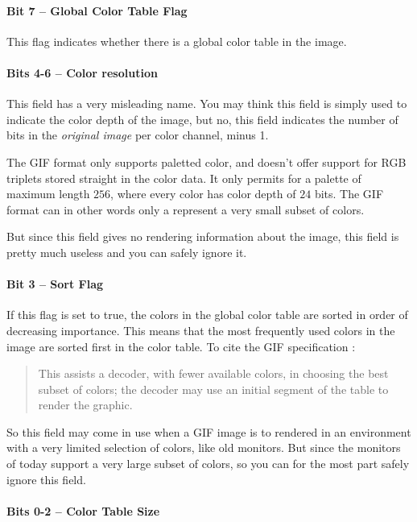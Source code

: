 \paragraph{Bit 7 --  Global Color Table Flag}

This flag indicates whether there is a global color table in the
image.

\paragraph{Bits 4-6 -- Color resolution}

This field has a very misleading name. You may think this field is
simply used to indicate the color depth of the image, but no, this
field indicates the number of bits in the \textit{original image} per
color channel, minus 1.

The GIF format only supports paletted color, and doesn't offer support
for RGB triplets stored straight in the color data. It only permits
for a palette of maximum length $256$, where every color has color
depth of $24$ bits. The GIF format can in other words only a represent
a very small subset of colors.

But since this field gives no rendering information about the image,
this field is pretty much useless and you can safely ignore it.

\paragraph{Bit 3 -- Sort Flag}

If this flag is set to true, the colors in the global color table are
sorted in order of decreasing importance. This means that the most
frequently used colors in the image are sorted first in the color
table. To cite the GIF specification \cite{gif89a}:

\begin{quote}
  This assists a decoder, with fewer available colors, in choosing
  the best subset of colors; the decoder may use an initial segment
  of the table to render the graphic.
\end{quote}

So this field may come in use when a GIF image is to rendered in an
environment with a very limited selection of colors, like old
monitors.  But since the monitors of today support a very large subset
of colors, so you can for the most part safely ignore this field.

\paragraph{Bits 0-2 -- Color Table Size}

